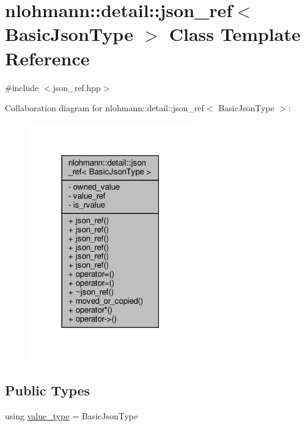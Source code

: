 \hypertarget{classnlohmann_1_1detail_1_1json__ref}{}\section{nlohmann\+:\+:detail\+:\+:json\+\_\+ref$<$ Basic\+Json\+Type $>$ Class Template Reference}
\label{classnlohmann_1_1detail_1_1json__ref}


{\ttfamily \#include $<$json\+\_\+ref.\+hpp$>$}



Collaboration diagram for nlohmann\+:\+:detail\+:\+:json\+\_\+ref$<$ Basic\+Json\+Type $>$\+:\nopagebreak
\begin{figure}[H]
\begin{center}
\leavevmode
\includegraphics[width=199pt]{classnlohmann_1_1detail_1_1json__ref__coll__graph}
\end{center}
\end{figure}
\subsection*{Public Types}
\begin{DoxyCompactItemize}
\item 
using \hyperlink{classnlohmann_1_1detail_1_1json__ref_a78d76cf288141049568c0d670ed670ef}{value\+\_\+type} = Basic\+Json\+Type
\end{DoxyCompactItemize}
